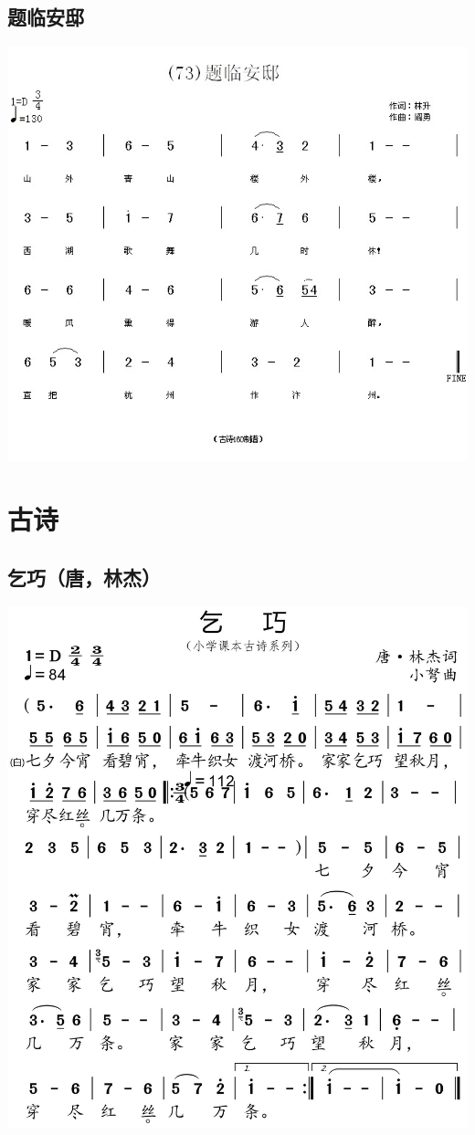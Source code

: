 \documentclass[cn,pad,twocol]{elegantbook}
\begin{document}
\section{题临安邸}
    \includegraphics[width=\textwidth]{dongxiao/20200808-题临安邸-陆游.jpg}                             
 
\chapter{古诗}
\section{乞巧（唐，林杰）}
    \includegraphics[width=\textwidth]{dongxiao/20200627-古诗-乞巧.jpg}     
\end{document}
